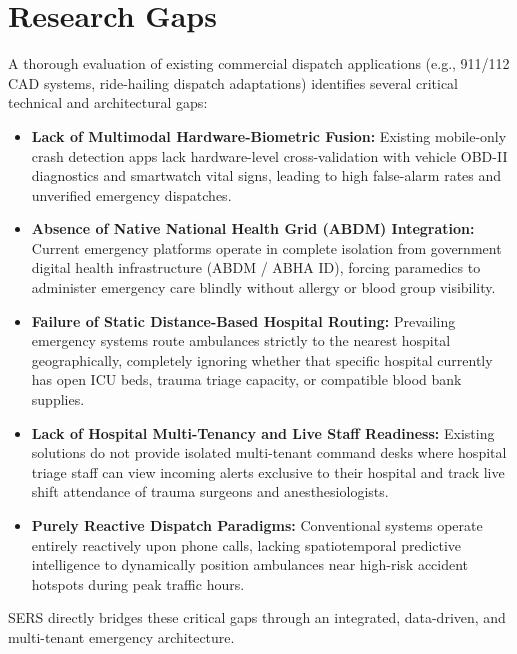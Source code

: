 \documentclass[12pt,a4paper]{article}
\begin{document}
\clearpage
\section{Research Gaps}
A thorough evaluation of existing commercial dispatch applications (e.g., 911/112 CAD systems, ride-hailing dispatch adaptations) identifies several critical technical and architectural gaps:

\begin{itemize}
    \item \textbf{Lack of Multimodal Hardware-Biometric Fusion:} Existing mobile-only crash detection apps lack hardware-level cross-validation with vehicle OBD-II diagnostics and smartwatch vital signs, leading to high false-alarm rates and unverified emergency dispatches.
    \item \textbf{Absence of Native National Health Grid (ABDM) Integration:} Current emergency platforms operate in complete isolation from government digital health infrastructure (ABDM / ABHA ID), forcing paramedics to administer emergency care blindly without allergy or blood group visibility.
    \item \textbf{Failure of Static Distance-Based Hospital Routing:} Prevailing emergency systems route ambulances strictly to the nearest hospital geographically, completely ignoring whether that specific hospital currently has open ICU beds, trauma triage capacity, or compatible blood bank supplies.
    \item \textbf{Lack of Hospital Multi-Tenancy and Live Staff Readiness:} Existing solutions do not provide isolated multi-tenant command desks where hospital triage staff can view incoming alerts exclusive to their hospital and track live shift attendance of trauma surgeons and anesthesiologists.
    \item \textbf{Purely Reactive Dispatch Paradigms:} Conventional systems operate entirely reactively upon phone calls, lacking spatiotemporal predictive intelligence to dynamically position ambulances near high-risk accident hotspots during peak traffic hours.
\end{itemize}

SERS directly bridges these critical gaps through an integrated, data-driven, and multi-tenant emergency architecture.

\clearpage
\end{document}
